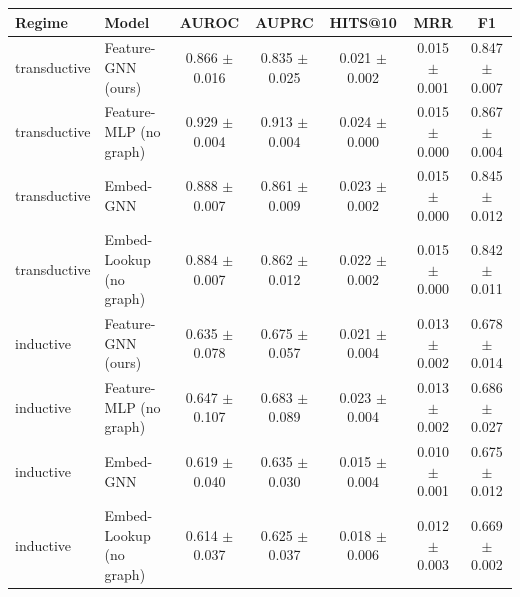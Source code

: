 \begin{tabular}{llccccc}
\toprule
Regime & Model & AUROC & AUPRC & HITS@10 & MRR & F1 \\
\midrule
transductive & Feature-GNN (ours) & 0.866 $\pm$ 0.016 & 0.835 $\pm$ 0.025 & 0.021 $\pm$ 0.002 & 0.015 $\pm$ 0.001 & 0.847 $\pm$ 0.007 \\
transductive & Feature-MLP (no graph) & 0.929 $\pm$ 0.004 & 0.913 $\pm$ 0.004 & 0.024 $\pm$ 0.000 & 0.015 $\pm$ 0.000 & 0.867 $\pm$ 0.004 \\
transductive & Embed-GNN & 0.888 $\pm$ 0.007 & 0.861 $\pm$ 0.009 & 0.023 $\pm$ 0.002 & 0.015 $\pm$ 0.000 & 0.845 $\pm$ 0.012 \\
transductive & Embed-Lookup (no graph) & 0.884 $\pm$ 0.007 & 0.862 $\pm$ 0.012 & 0.022 $\pm$ 0.002 & 0.015 $\pm$ 0.000 & 0.842 $\pm$ 0.011 \\
\midrule
inductive & Feature-GNN (ours) & 0.635 $\pm$ 0.078 & 0.675 $\pm$ 0.057 & 0.021 $\pm$ 0.004 & 0.013 $\pm$ 0.002 & 0.678 $\pm$ 0.014 \\
inductive & Feature-MLP (no graph) & 0.647 $\pm$ 0.107 & 0.683 $\pm$ 0.089 & 0.023 $\pm$ 0.004 & 0.013 $\pm$ 0.002 & 0.686 $\pm$ 0.027 \\
inductive & Embed-GNN & 0.619 $\pm$ 0.040 & 0.635 $\pm$ 0.030 & 0.015 $\pm$ 0.004 & 0.010 $\pm$ 0.001 & 0.675 $\pm$ 0.012 \\
inductive & Embed-Lookup (no graph) & 0.614 $\pm$ 0.037 & 0.625 $\pm$ 0.037 & 0.018 $\pm$ 0.006 & 0.012 $\pm$ 0.003 & 0.669 $\pm$ 0.002 \\
\bottomrule
\end{tabular}

